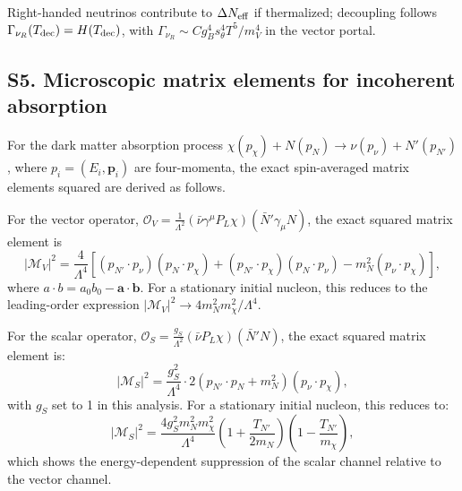 \documentclass[aps,twocolumn,superscriptaddress,groupedaddress,nofootinbib,floatfix]{revtex4}
\begin{document}
Right-handed neutrinos contribute to $\Delta N_{\rm eff}$ if thermalized; decoupling follows $\Gamma_{\nu_R}(T_{\rm dec})=H(T_{\rm dec})$, with $\Gamma_{\nu_R}\sim C g_B^4s_\theta^4T^5/m_V^4$ in the vector portal.


\subsection*{S5. Microscopic matrix elements for incoherent absorption}

For the dark matter absorption process \(\chi(p_\chi) + N(p_N) \to \nu(p_\nu) + N'(p_{N'})\), where \(p_i = (E_i, \mathbf{p}_i)\) are four-momenta, the exact spin-averaged matrix elements squared are derived as follows.

For the vector operator, $\mathcal{O}_V = \frac{1}{\Lambda^2} (\bar{\nu} \gamma^\mu P_L \chi)(\bar{N}' \gamma_\mu N)$, the exact squared matrix element is
\begin{equation}
|\mathcal{M}_V|^2 = \frac{4}{\Lambda^4}
\left[
(p_{N'} \cdot p_\nu)(p_N \cdot p_\chi)
+ (p_{N'} \cdot p_\chi)(p_N \cdot p_\nu)
- m_N^2 (p_\nu \cdot p_\chi)
\right],
\end{equation} 
where \(a \cdot b = a_0 b_0 - \mathbf{a} \cdot \mathbf{b}\). For a stationary initial nucleon, this reduces to the leading-order expression \(|\mathcal{M}_V|^2 \to 4m_N^2 m_\chi^2/\Lambda^4\).

For the scalar operator, $\mathcal{O}_S = \frac{g_S}{\Lambda^2} (\bar{\nu} P_L \chi)(\bar{N}' N)$, the exact squared matrix element is: 
\begin{equation}
|\mathcal{M}_S|^2 = \frac{g_S^2}{\Lambda^4}
\cdot 2 \left( p_{N'} \cdot p_N + m_N^2 \right) (p_\nu \cdot p_\chi), 
\end{equation} 
with \(g_S\) set to 1 in this analysis. For a stationary initial nucleon, this reduces to:
\begin{equation}
|\mathcal{M}_S|^2 = \frac{4 g_S^2 m_N^2 m_\chi^2}{\Lambda^4}
\left( 1 + \frac{T_{N'}}{2m_N} \right)
\left( 1 - \frac{T_{N'}}{m_\chi} \right),
\end{equation} 
which shows the energy-dependent suppression of the scalar channel relative to the vector channel.
\end{document}
